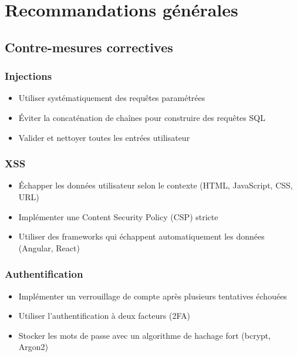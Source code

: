 
\chapter{Recommandations générales}

\section{Contre-mesures correctives}

\subsection{Injections}
\begin{itemize}
    \item Utiliser systématiquement des requêtes paramétrées
    \item Éviter la concaténation de chaînes pour construire des requêtes SQL
    \item Valider et nettoyer toutes les entrées utilisateur
\end{itemize}

\subsection{XSS}
\begin{itemize}
    \item Échapper les données utilisateur selon le contexte (HTML, JavaScript, CSS, URL)
    \item Implémenter une Content Security Policy (CSP) stricte
    \item Utiliser des frameworks qui échappent automatiquement les données (Angular, React)
\end{itemize}

\subsection{Authentification}
\begin{itemize}
    \item Implémenter un verrouillage de compte après plusieurs tentatives échouées
    \item Utiliser l'authentification à deux facteurs (2FA)
    \item Stocker les mots de passe avec un algorithme de hachage fort (bcrypt, Argon2)
\end{itemize}

